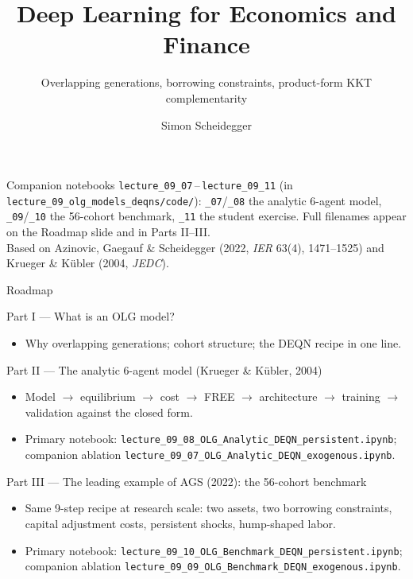 \documentclass[aspectratio=169,11pt]{beamer}
\title[Deep Learning for Dynamic Economic Models]
{Deep Learning for Economics and Finance}
\subtitle{Overlapping generations, borrowing constraints, product-form KKT complementarity}
\author{Simon Scheidegger}
\institute[HEC Lausanne]{HEC, University of Lausanne}
\date{}
\begin{document}
{
\begin{frame}
\titlepage
\vspace{-0.4cm}
\begin{center}
{\footnotesize Companion notebooks \texttt{lecture\_09\_07}\,--\,\texttt{lecture\_09\_11} (in \texttt{lecture\_09\_olg\_models\_deqns/code/}): \texttt{\_07}/\texttt{\_08} the analytic 6-agent model, \texttt{\_09}/\texttt{\_10} the 56-cohort benchmark, \texttt{\_11} the student exercise.  Full filenames appear on the Roadmap slide and in Parts II--III.}\\[3pt]
{\footnotesize Based on Azinovic, Gaegauf \& Scheidegger (2022, \emph{IER} 63(4), 1471--1525) and Krueger \& K\"ubler (2004, \emph{JEDC}).}
\end{center}
\end{frame}
}

\begin{frame}{Roadmap}
\footnotesize
\begin{block}{Part I --- What is an OLG model?}
\vspace{-3pt}\begin{itemize}\itemsep0pt
    \item Why overlapping generations; cohort structure; the DEQN recipe in one line.
\end{itemize}
\end{block}
\vspace{-2pt}
\begin{block}{Part II --- The analytic 6-agent model (Krueger \& K\"ubler, 2004)}
\vspace{-3pt}\begin{itemize}\itemsep0pt
    \item Model $\to$ equilibrium $\to$ cost $\to$ FREE $\to$ architecture $\to$ training $\to$ validation against the closed form.
    \item Primary notebook: \texttt{lecture\_09\_08\_OLG\_Analytic\_DEQN\_persistent.ipynb}; companion ablation \texttt{lecture\_09\_07\_OLG\_Analytic\_DEQN\_exogenous.ipynb}.
\end{itemize}
\end{block}
\vspace{-2pt}
\begin{block}{Part III --- The leading example of AGS (2022): the 56-cohort benchmark}
\vspace{-3pt}\begin{itemize}\itemsep0pt
    \item Same 9-step recipe at research scale: two assets, two borrowing constraints, capital adjustment costs, persistent shocks, hump-shaped labor.
    \item Primary notebook: \texttt{lecture\_09\_10\_OLG\_Benchmark\_DEQN\_persistent.ipynb}; companion ablation \texttt{lecture\_09\_09\_OLG\_Benchmark\_DEQN\_exogenous.ipynb}.
\end{itemize}
\end{block}
\end{frame}
\end{document}
